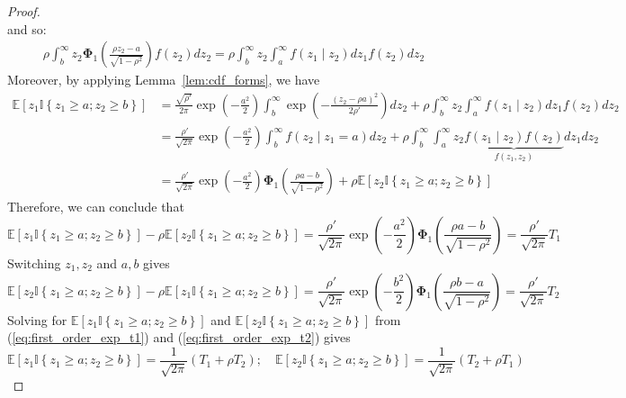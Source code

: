 \documentclass[10pt]{article} %
\theoremstyle{definition}
\theoremstyle{plain}
\newcommand{\paren}[1]{\left(#1\right)}
\newcommand{\indy}[1]{\mathbb{I}\left\{#1\right\}}
\providecommand{\E}{\mathbb{E}}
\begin{document}
\begin{proof}
\begin{equation}
\end{equation}
and so:
    \begin{align*}
    \rho \int_b^\infty z_2 \bm{\Phi}_1\left(\frac{\rho z_2 - a}{\sqrt{1-\rho^2}}\right) f(z_2) dz_2= 
    \rho \int_b^\infty z_2 \int_a^\infty f(z_1 \mid z_2) dz_1 f(z_2) dz_2
    \end{align*}
    Moreover, by applying Lemma~\ref{lem:cdf_forms}, we have
    \begin{align*}
        \E\left[z_1\indy{z_1\geq a; z_2\geq b}\right] & = \frac{\sqrt{\rho'}}{2\pi}\exp\paren{-\frac{a^2}{2}}\int_b^\infty\exp\paren{-\frac{\paren{z_2 - \rho a}^2}{2\rho'}}dz_2 + \rho \int_b^\infty z_2 \int_a^\infty f(z_1 \mid z_2) dz_1 f(z_2) dz_2\\
        & = \frac{\rho'}{\sqrt{2\pi}}\exp\paren{-\frac{a^2}{2}}\int_b^\infty f\paren{z_2\mid z_1 = a}dz_2 + \rho \int_b^\infty \int_a^\infty z_2 \underbrace{f(z_1 \mid z_2) f(z_2)}_{f(z_1,z_2)} dz_1  dz_2 \\ 
        & = \frac{\rho'}{\sqrt{2\pi}}\exp\paren{-\frac{a^2}{2}}\bm{\Phi}_1\paren{\frac{\rho a - b}{\sqrt{1-\rho^2}}} + \rho\E\left[z_2\indy{z_1\geq a; z_2\geq b}\right]
    \end{align*}
    Therefore, we can conclude that
    \begin{equation}
        \label{eq:first_order_exp_t1}
        \E\left[z_1\indy{z_1\geq a; z_2\geq b}\right] - \rho\E\left[z_2\indy{z_1\geq a; z_2\geq b}\right] = \frac{\rho'}{\sqrt{2\pi}}\exp\paren{-\frac{a^2}{2}}\bm{\Phi}_1\paren{\frac{\rho a - b}{\sqrt{1-\rho^2}}} = \frac{\rho'}{\sqrt{2\pi}}T_1
    \end{equation}
    Switching $z_1, z_2$ and $a, b$ gives
    \begin{equation}
        \label{eq:first_order_exp_t2}
        \E\left[z_2\indy{z_1\geq a; z_2\geq b}\right] - \rho\E\left[z_1\indy{z_1\geq a; z_2\geq b}\right] = \frac{\rho'}{\sqrt{2\pi}}\exp\paren{-\frac{b^2}{2}}\bm{\Phi}_1\paren{\frac{\rho b - a}{\sqrt{1-\rho^2}}} = \frac{\rho'}{\sqrt{2\pi}}T_2
    \end{equation}
    Solving for $\E\left[z_1\indy{z_1\geq a; z_2\geq b}\right]$ and $\E\left[z_2\indy{z_1\geq a; z_2\geq b}\right]$ from (\ref{eq:first_order_exp_t1}) and (\ref{eq:first_order_exp_t2}) gives
    \[
        \E\left[z_1\indy{z_1\geq a; z_2\geq b}\right] =\frac{1}{\sqrt{2\pi}}\paren{T_1 + \rho T_2};\quad 
        \E\left[z_2\indy{z_1\geq a; z_2\geq b}\right] = \frac{1}{\sqrt{2\pi}}\paren{T_2 + \rho T_1}
    \]
\end{proof}
\end{document}
